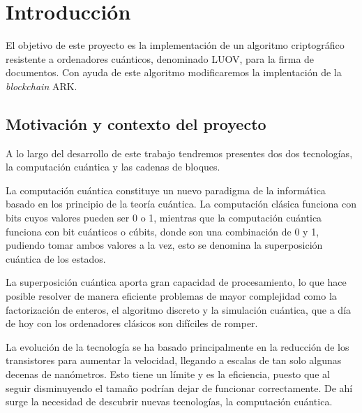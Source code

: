 \chapter{Introducción}

El objetivo de este proyecto es la implementación de un algoritmo criptográfico resistente a ordenadores cuánticos, denominado LUOV, para la firma de documentos. Con ayuda de este algoritmo modificaremos la implentación de la \textit{blockchain} ARK.

\section{Motivación y contexto del proyecto}
\label{sec:intro:motivacion} %


A lo largo del desarrollo de este trabajo tendremos presentes dos dos tecnologías, la computación cuántica y las cadenas de bloques. 

La computación cuántica constituye un nuevo paradigma de la informática basado en los principio de la teoría cuántica. La computación clásica funciona con bits cuyos valores pueden ser 0 o 1, mientras que la computación cuántica funciona con bit cuánticos o cúbits, donde son una combinación de 0 y 1, pudiendo tomar ambos valores a la vez, esto se denomina la superposición cuántica de los estados.

La superposición cuántica aporta gran capacidad de procesamiento, lo que hace posible resolver de manera eficiente problemas de mayor complejidad como la factorización de enteros, el algoritmo discreto y la simulación cuántica, que a día de hoy con los ordenadores clásicos son difíciles de romper. 


La evolución de la tecnología se ha basado principalmente en la reducción de los transistores para aumentar la velocidad, llegando a escalas de tan solo algunas decenas de nanómetros. Esto tiene un límite y es la eficiencia, puesto que al seguir disminuyendo el tamaño podrían dejar de funcionar correctamente. De ahí surge la necesidad de descubrir nuevas tecnologías, la computación cuántica.

